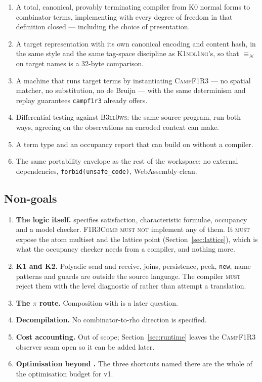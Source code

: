 \documentclass[11pt,a4paper]{article}
\newcommand{\code}[1]{\texttt{#1}}
\newcommand{\Comb}{\textsc{F1R3Comb}}
\newcommand{\Kind}{\textsc{K1ndl1ng}}
\newcommand{\Camp}{\textsc{CampF1R3}}
\newcommand{\Bell}{\textsc{B3ll0ws}}
\newcommand{\MUST}{\textsc{must}}
\newcommand{\MUSTNOT}{\textsc{must not}}
\newcommand{\nequiv}{\equiv_{\mathcal{N}}}
\theoremstyle{definition}
\theoremstyle{plain}
\begin{document}
\begin{enumerate}[leftmargin=1.6em]
\item A total, canonical, provably terminating compiler from K0 normal forms
to combinator terms, implementing \cite[Def.~6.6]{draft3} with every degree of
freedom in that definition closed --- including the choice of presentation.
\item A target representation with its own canonical encoding and content
hash, in the same style and the same tag-space discipline as \Kind's, so that
$\nequiv$ on target names is a 32-byte comparison.
\item A machine that runs target terms by instantiating \Camp{} --- no
spatial matcher, no substitution, no de Bruijn --- with the same determinism
and replay guarantees \code{campf1r3} already offers.
\item Differential testing against \Bell: the same source program, run both
ways, agreeing on the observations an encoded context can make.
\item A term type and an occupancy report that \cite{logic} can build on
without a compiler.
\item The same portability envelope as the rest of the workspace: no external
dependencies, \code{forbid(unsafe\_code)}, WebAssembly-clean.
\end{enumerate}

\subsection{Non-goals}\label{sec:nongoals}

\begin{enumerate}[leftmargin=1.6em]
\item \textbf{The logic itself.} \cite{logic} specifies satisfaction,
characteristic formulae, occupancy and a model checker. \Comb{} \MUSTNOT{}
implement any of them. It \MUST{} expose the atom multiset and the lattice
point (Section~\ref{sec:lattice}), which is what the occupancy checker needs
from a compiler, and nothing more.
\item \textbf{K1 and K2.} Polyadic send and receive, joins, persistence, peek,
\code{new}, name patterns and guards are outside the source language. The
compiler \MUST{} reject them with the level diagnostic of
\cite[Req.~2.1]{k1ndl1ng} rather than attempt a translation.
\item \textbf{The $\pi$ route.} Composition with \cite{nowns} is a later
question.
\item \textbf{Decompilation.} No combinator-to-rho direction is specified.
\item \textbf{Cost accounting.} Out of scope; Section~\ref{sec:runtime}
leaves the \Camp{} observer seam open so it can be added later.
\item \textbf{Optimisation beyond \cite[Rem.~6.7]{draft3}.} The three
shortcuts named there are the whole of the optimisation budget for v1.
\end{enumerate}
\end{document}
